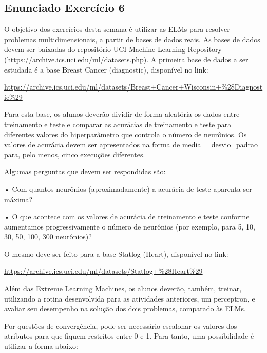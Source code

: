 \documentclass[
]{article}
\newenvironment{Shaded}{\begin{snugshade}}{\end{snugshade}}
\newcommand{\DecValTok}[1]{\textcolor[rgb]{0.00,0.00,0.81}{#1}}
\newcommand{\KeywordTok}[1]{\textcolor[rgb]{0.13,0.29,0.53}{\textbf{#1}}}
\newcommand{\NormalTok}[1]{#1}
\newcommand{\OperatorTok}[1]{\textcolor[rgb]{0.81,0.36,0.00}{\textbf{#1}}}
\begin{document}
\begin{Shaded}
\begin{Highlighting}[]
{\NormalTok{    eepoca<-evec[nepocas]}
\NormalTok{  \}}
\NormalTok{  retlist<-}\KeywordTok{list}\NormalTok{ ( wt, evec[ }\DecValTok{1}\OperatorTok{:}\NormalTok{nepocas ] )}
  \KeywordTok{return}\NormalTok{ (retlist)}
\NormalTok{\}}
\end{Highlighting}
\end{Shaded}

\hypertarget{enunciado-exercuxedcio-6}{%
\subsection{Enunciado Exercício 6}\label{enunciado-exercuxedcio-6}}

O objetivo dos exercícios desta semana é utilizar as ELMs para resolver
problemas multidimensionais, a partir de bases de dados reais. As bases
de dados devem ser baixadas do repositório UCI Machine Learning
Repository (\url{https://archive.ics.uci.edu/ml/datasets.php}). A
primeira base de dados a ser estudada é a base Breast Cancer
(diagnostic), disponível no link:

\url{https://archive.ics.uci.edu/ml/datasets/Breast+Cancer+Wisconsin+\%28Diagnostic\%29}

Para esta base, os alunos deverão dividir de forma aleatória os dados
entre treinamento e teste e comparar as acurácias de treinamento e teste
para diferentes valores do hiperparâmetro que controla o número de
neurônios. Os valores de acurácia devem ser apresentados na forma de
media ± desvio\_padrao para, pelo menos, cinco execuções diferentes.

Algumas perguntas que devem ser respondidas são:

• Com quantos neurônios (aproximadamente) a acurácia de teste aparenta
ser máxima?

• O que acontece com os valores de acurácia de treinamento e teste
conforme aumentamos progressivamente o número de neurônios (por exemplo,
para 5, 10, 30, 50, 100, 300 neurônios)?

O mesmo deve ser feito para a base Statlog (Heart), disponível no link:

\url{https://archive.ics.uci.edu/ml/datasets/Statlog+\%28Heart\%29}

Além das Extreme Learning Machines, os alunos deverão, também, treinar,
utilizando a rotina desenvolvida para as atividades anteriores, um
perceptron, e avaliar seu desempenho na solução dos dois problemas,
comparado às ELMs.

Por questões de convergência, pode ser necessário escalonar os valores
dos atributos para que fiquem restritos entre 0 e 1. Para tanto, uma
possibilidade é utilizar a forma abaixo:
\end{document}

